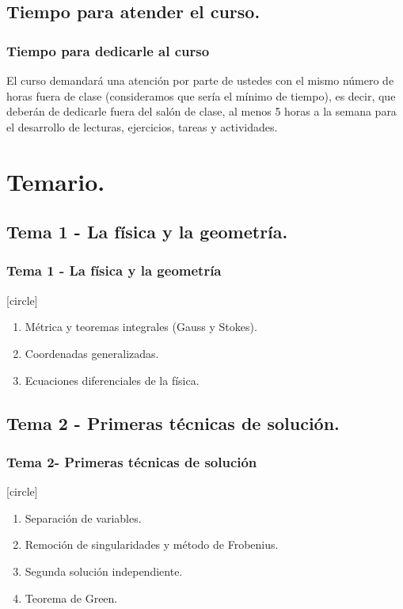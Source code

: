 \subsection{Tiempo para atender el curso.}
\begin{frame}
\frametitle{Tiempo para dedicarle al curso}
El curso demandará una atención por parte de ustedes con el mismo número de horas fuera de clase (consideramos que sería el mínimo de tiempo), es decir, que deberán de dedicarle fuera del salón de clase, al menos 5 horas a la semana para el desarrollo de lecturas, ejercicios, tareas y actividades.
\end{frame}
\section{Temario.}
\subsection{Tema 1 - La física y la geometría.}
\begin{frame}
\frametitle{Tema 1 - La física y la geometría}
[circle]
\begin{enumerate}[<+->]
\item Métrica y teoremas integrales (Gauss y Stokes).
\item Coordenadas generalizadas.
\item Ecuaciones diferenciales de la física.
\end{enumerate}
\end{frame}
\subsection{Tema 2 - Primeras técnicas de solución.}
\begin{frame}
\frametitle{Tema 2- Primeras técnicas de solución}
[circle]
\begin{enumerate}[<+->]
\item Separación de variables.
\item Remoción de singularidades y método de Frobenius.
\item Segunda solución independiente.
\item Teorema de Green.    
\end{enumerate}
\end{frame}
